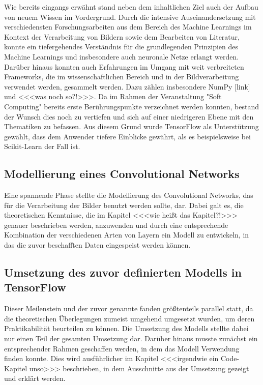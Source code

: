 Wie bereits eingangs erwähnt stand neben dem inhaltlichen Ziel auch der Aufbau von neuem Wissen im Vordergrund. Durch die
intensive Auseinandersetzung mit verschiedensten Forschungsarbeiten aus dem Bereich des Machine Learnings im Kontext der
Verarbeitung von Bildern sowie dem Bearbeiten von Literatur, konnte ein tiefergehendes Verständnis für die grundlegenden
Prinzipien des Machine Learnings und insbesondere auch neuronale Netze erlangt werden.
Darüber hinaus konnten auch Erfahrungen im Umgang mit weit verbreiteten Frameworks, die im wissenschaftlichen Bereich und
in der Bildverarbeitung verwendet werden, gesammelt werden. Dazu zählen insbesondere NumPy [link] und <<<was noch so?!>>>.
Da im Rahmen der Veranstaltung "Soft Computing" bereits erste Berührungspunkte verzeichnet werden konnten, bestand der
Wunsch dies noch zu vertiefen und sich auf einer niedrigeren Ebene mit den Thematiken zu befassen. Aus diesem Grund wurde
TensorFlow als Unterstützung gewählt, dass dem Anwender tiefere Einblicke gewährt, als es beispielsweise bei Scikit-Learn
der Fall ist.

\subsection{Modellierung eines Convolutional Networks}

Eine spannende Phase stellte die Modellierung des Convolutional Networks, das für die Verarbeitung der Bilder benutzt
werden sollte, dar. Dabei galt es, die theoretischen Kenntnisse, die im Kapitel <<<wie heißt das Kapitel?!>>> genauer
beschrieben werden, anzuwenden und durch eine entsprechende Kombination der verschiedenen Arten von Layern ein Modell
zu entwickeln, in das die zuvor beschafften Daten eingespeist werden können.

\subsection{Umsetzung des zuvor definierten Modells in TensorFlow}

Dieser Meilenstein und der zuvor genannte fanden größtenteils parallel statt, da die theoretischen Überlegungen zumeist
umgehend umgesetzt wurden, um deren Praktikabilität beurteilen zu können. Die Umsetzung des Modells stellte dabei nur
einen Teil der gesamten Umsetzung dar. Darüber hinaus musste zunächst ein entsprechender Rahmen geschaffen werden, in
dem das Modell Verwendung finden konnte. Dies wird ausführlicher im Kapitel <<<irgendwie ein Code-Kapitel unso>>>
beschrieben, in dem Ausschnitte aus der Umsetzung gezeigt und erklärt werden.

